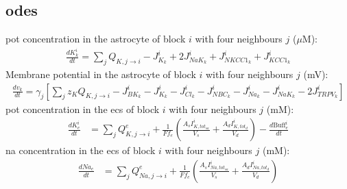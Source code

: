 \documentclass[11pt]{elsarticle}
\newcommand{\uM}{$\mu$M\xspace}
\newcommand{\na}{\gls{na}\xspace}
\newcommand{\pot}{\gls{pot}\xspace}
\begin{document}
\subsection{\Glspl{ode}}
%
\pot concentration in the astrocyte of block $i$ with four neighbours $j$ (\uM):
\begin{align}
\frac{d K_k^i}{dt} = \sum_j Q_{K,j \to i} - J_{K_k}^i + 2 J_{NaK_{k}}^i + J_{NKCC1_{k}}^i +  J_{KCC1_{k}}^i
\end{align}
%
Membrane potential in the astrocyte of block $i$ with four neighbours $j$ (mV):
\begin{align}
\frac{d v_k}{dt} = \gamma_j \left[ \sum_j z_K Q_{K,j \to i} -J_{BK_k}^i - J_{K_k}^i - J_{Cl_k}^i - J_{NBC_k}^i - J_{Na_k}^i - J_{NaK_k}^i - 2J_{TRPV_k}^i \right]
\end{align}
%
\pot concentration in the \gls{ecs} of block $i$ with four neighbours $j$ (mM):
\begin{align}
\frac{dK_{e}^i}{dt} &= \sum_j Q^{e}_{K,j\to i} + \frac{1}{F f_e} \left( \frac{A_s I_{K,tot_{sa}}^i}{V_s} + \frac{A_d I_{K,tot_d}^i}{V_d} \right) - \frac{d \text{Buff}^i_e}{dt}
\end{align}
%
\na concentration in the \gls{ecs} of block $i$ with four neighbours $j$ (mM):
\begin{align}
\frac{d Na_e}{dt} &= \sum_j Q^{e}_{Na,j\to i} + \frac{1}{F f_e} \left( \frac{A_s I_{Na,tot_{sa}}^i}{V_s} + \frac{A_d I_{Na,tot_d}^i}{V_d} \right)
\end{align}
%
\end{document}
